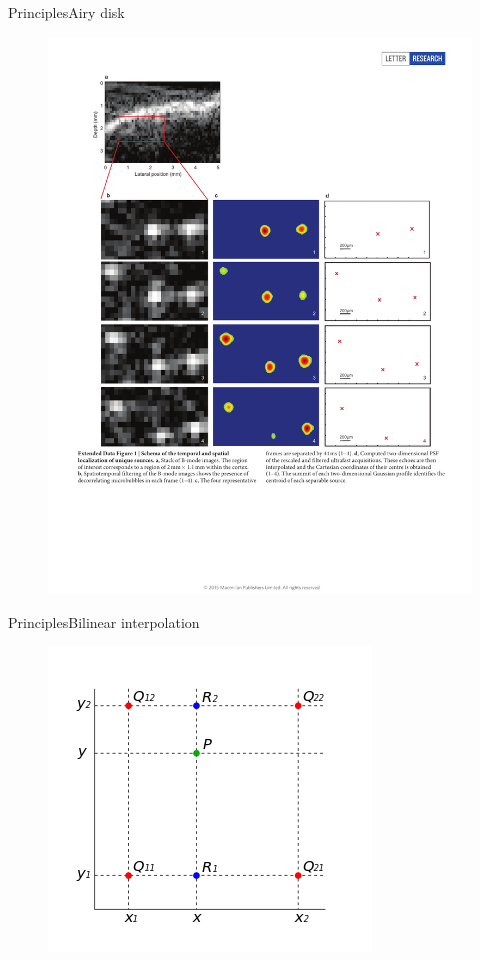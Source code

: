 \documentclass{beamer}
\begin{document}
\begin{frame}{Principles}{Airy disk}
\begin{figure}
	\centering
	\includegraphics[width=0.8\linewidth]{need2}
\end{figure}
\end{frame}

\begin{frame}{Principles}{Bilinear interpolation}
	\begin{figure}
		\centering
		\includegraphics[width=0.75\linewidth]{bilinear}
	\end{figure}
\end{frame}
\end{document}

